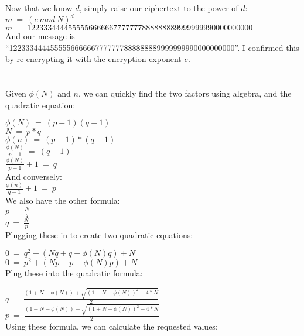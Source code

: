 \documentclass[10pt]{article}
\begin{document}
\noindent Now that we know $d$, simply raise our ciphertext to the power of $d$:\\

\noindent $m\ =\ (c\ mod\ N)^d$\\
$m\ =\ 1223334444555556666667777777888888889999999990000000000$\\

And our message is ``1223334444555556666667777777888888889999999990000000000''. I
confirmed this by re-encrypting it with the encryption exponent $e$.

\section{}
Given $\phi(N)$ and $n$, we can quickly find the two factors using algebra, and the
quadratic equation:

\noindent $\phi(N)\ =\ (p-1)(q-1)$\\
$N\ =\ p*q$\\

\noindent $\phi(n)\ =\ (p-1)*(q-1)$\\
$\frac{\phi(N)}{p-1}\ =\ (q-1)$\\
$\frac{\phi(N)}{p-1}+1\ =\ q$\\

\noindent And conversely:\\

\noindent$\frac{\phi(n)}{q-1}+1\ =\ p$\\

\noindent We also have the other formula:\\

\noindent $p\ =\ \frac{N}{q}$\\
$q\ =\ \frac{N}{p}$\\

Plugging these in to create two quadratic equations:

\noindent $0\ =\ q^2+(Nq+q-\phi(N)q)+N$\\
\noindent $0\ =\ p^2+(Np+p-\phi(N)p)+N$\\

Plug these into the quadratic formula:

\noindent $q\ =\ \frac{(1+N-\phi(N)) + \sqrt{(1+N-\phi(N))^2-4*N}}{2}$\\
\noindent $p\ =\ \frac{(1+N-\phi(N)) - \sqrt{(1+N-\phi(N))^2-4*N}}{2}$\\

Using these formula, we can calculate the requested values:\\
\end{document}
